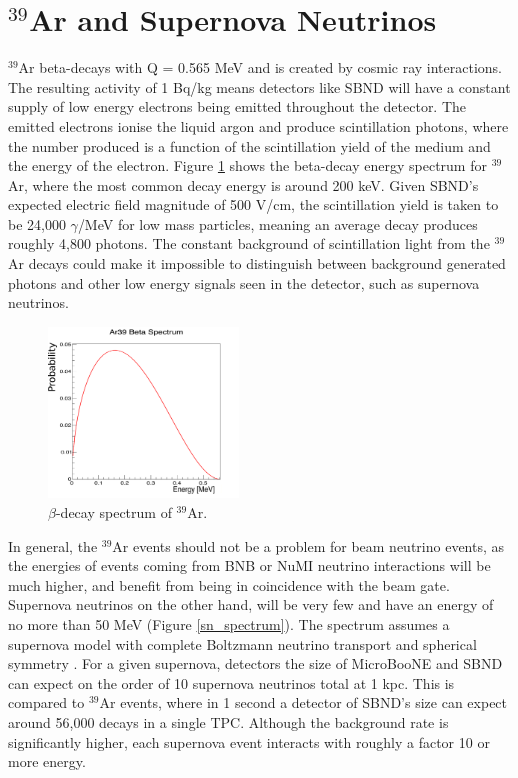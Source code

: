 \documentclass[a4paper]{article}
\begin{document}
\section{$^{39}$Ar and Supernova Neutrinos}

$^{39}$Ar beta-decays with Q = 0.565 MeV and is created by cosmic ray interactions. The resulting activity of 1 Bq/kg means detectors like SBND will have a constant supply of low energy electrons being emitted throughout the detector. The emitted electrons ionise the liquid argon and produce scintillation photons, where the number produced is a function of the scintillation yield of the medium and the energy of the electron. Figure \ref{ar_spectrum} shows the beta-decay energy spectrum for $^{39}$Ar, where the most common decay energy is around 200 keV. Given SBND's expected electric field magnitude of 500 V/cm, the scintillation yield is taken to be 24,000 $\gamma$/MeV for low mass particles, meaning an average decay produces roughly 4,800 photons. The constant background of scintillation light from the $^{39}$Ar decays could make it impossible to distinguish between background generated photons and other low energy signals seen in the detector, such as supernova neutrinos.

\begin{figure}[H]
\center
\includegraphics[width=0.45\textwidth, height=0.4\textwidth]{ar39_spectrum_larger.pdf}
\caption{$\beta$-decay spectrum of $^{39}$Ar.}\label{ar_spectrum}
\end{figure}

In general, the $^{39}$Ar events should not be a problem for beam neutrino events, as the energies of events coming from BNB or NuMI neutrino interactions will be much higher, and benefit from being in coincidence with the beam gate. Supernova neutrinos on the other hand, will be very few and have an energy of no more than 50 MeV (Figure \ref{sn_spectrum}). The spectrum assumes a supernova model with complete Boltzmann neutrino transport and spherical symmetry \cite{sn_spectrum}. For a given supernova, detectors the size of MicroBooNE and SBND can expect on the order of 10 supernova neutrinos total at 1 kpc. This is compared to $^{39}$Ar events, where in 1 second a detector of SBND's size can expect around 56,000 decays in a single TPC. Although the background rate is significantly higher, each supernova event interacts with roughly a factor 10 or more energy.
\end{document}
